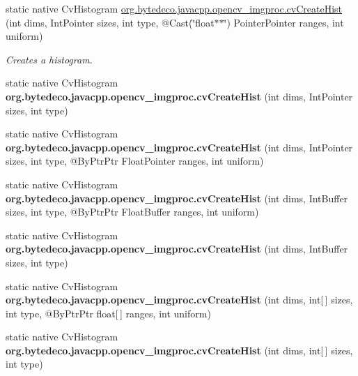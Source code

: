 \begin{DoxyCompactItemize}
\item 
static native Cv\+Histogram \hyperlink{group__imgproc__c_ga35e0a34e834d2b6654992a0116be5253}{org.\+bytedeco.\+javacpp.\+opencv\+\_\+imgproc.\+cv\+Create\+Hist} (int dims, Int\+Pointer sizes, int type, @Cast(\char`\"{}float$\ast$$\ast$\char`\"{}) Pointer\+Pointer ranges, int uniform)
\begin{DoxyCompactList}\small\item\em Creates a histogram. \end{DoxyCompactList}\item 
\mbox{\label{group__imgproc__c_ga39748346de1cf82202da464f074b8d16}} 
static native Cv\+Histogram {\bfseries org.\+bytedeco.\+javacpp.\+opencv\+\_\+imgproc.\+cv\+Create\+Hist} (int dims, Int\+Pointer sizes, int type)
\item 
\mbox{\label{group__imgproc__c_gae7674aa97dca021bb9c7324a89c4c240}} 
static native Cv\+Histogram {\bfseries org.\+bytedeco.\+javacpp.\+opencv\+\_\+imgproc.\+cv\+Create\+Hist} (int dims, Int\+Pointer sizes, int type, @By\+Ptr\+Ptr Float\+Pointer ranges, int uniform)
\item 
\mbox{\label{group__imgproc__c_ga1d26a47849f2c847c8cec6d838b8b089}} 
static native Cv\+Histogram {\bfseries org.\+bytedeco.\+javacpp.\+opencv\+\_\+imgproc.\+cv\+Create\+Hist} (int dims, Int\+Buffer sizes, int type, @By\+Ptr\+Ptr Float\+Buffer ranges, int uniform)
\item 
\mbox{\label{group__imgproc__c_gab93308e7c0fa95f094eda97c3fe13644}} 
static native Cv\+Histogram {\bfseries org.\+bytedeco.\+javacpp.\+opencv\+\_\+imgproc.\+cv\+Create\+Hist} (int dims, Int\+Buffer sizes, int type)
\item 
\mbox{\label{group__imgproc__c_ga2d7ea8e286dccde142fc7a7643b7a5cc}} 
static native Cv\+Histogram {\bfseries org.\+bytedeco.\+javacpp.\+opencv\+\_\+imgproc.\+cv\+Create\+Hist} (int dims, int\mbox{[}$\,$\mbox{]} sizes, int type, @By\+Ptr\+Ptr float\mbox{[}$\,$\mbox{]} ranges, int uniform)
\item 
\mbox{\label{group__imgproc__c_gad2016885770b618e54722317a4d87aaf}} 
static native Cv\+Histogram {\bfseries org.\+bytedeco.\+javacpp.\+opencv\+\_\+imgproc.\+cv\+Create\+Hist} (int dims, int\mbox{[}$\,$\mbox{]} sizes, int type)
$$
\end{DoxyCompactItemize}
